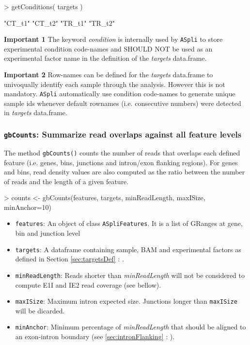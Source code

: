 \documentclass{article}
\newcommand{\secref}[1]{\ref{#1} : \nameref{#1}}
\begin{document}
\begin{Schunk}
\begin{Sinput}
> getConditions( targets )
\end{Sinput}
\begin{Soutput}
[1] "CT_t1" "CT_t2" "TR_t1" "TR_t2"
\end{Soutput}
\end{Schunk}


\textbf{Important 1} The keyword {\em condition} is internally used by \texttt{ASpli} to store experimental condition code-names and SHOULD NOT be used as an experimental factor name in the definition of the {\em targets} data.frame. 

\textbf{Important 2 } Row-names can be defined for the {\em targets} data.frame to univoqually identify each sample through the analysis. However this is not mandatory. \texttt{ASpli} automatically use condition code-names to generate unique sample ids whenever default rownames (i.e. consecutive numbers) were detected in {\em targets} data.frame.   

\subsubsection{\texttt{gbCounts}: Summarize read overlaps against all feature levels}

The method  \texttt{gbCounts()} counts the number of reads that overlaps each defined feature (i.e. genes, bins, junctions and intron/exon flanking regions). For genes and bins, read density values are also computed as the ratio between the number of reads and the length of a given feature. 

\begin{Schunk}
\begin{Sinput}
> counts      <-  gbCounts(features,
                          targets, 
                          minReadLength,
                          maxISize,
                          minAnchor=10)
\end{Sinput}
\end{Schunk}

\begin{itemize}
\item \texttt{features}: An object of class \texttt{ASpliFeatures}. It is a list of GRanges at gene, bin and junction level
\item \texttt{targets}: A dataframe containing sample, BAM and experimental factors as defined in Section \secref{sec:targetsDef}. 
\item \texttt{minReadLength}: Reads shorter than {\em minReadLength} will not be considered to compute E1I and IE2 read coverage (see bellow).
\item \texttt{maxISize}: Maximum intron expected size. Junctions longer than \texttt{maxISize} will be dicarded.
\item \texttt{minAnchor}: Minimum percentage of {\em minReadLength} that should be aligned to an exon-intron boundary (see \secref{sec:intronFlanking} ). 
\end{itemize}
\end{document}
